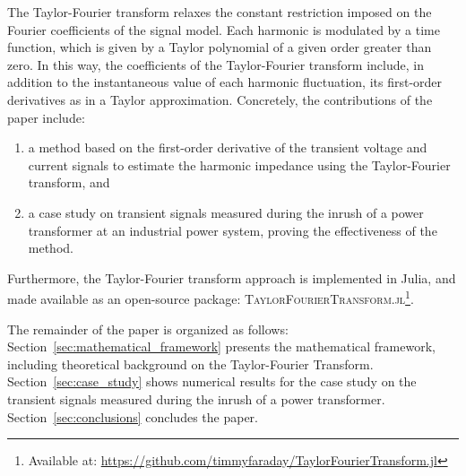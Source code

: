 The Taylor-Fourier transform relaxes the constant restriction imposed on the Fourier coefficients of the signal model. Each harmonic is modulated by a time function, which is given by a Taylor polynomial of a given order greater than zero. In this way, the coefficients of the Taylor-Fourier transform include, in addition to the instantaneous value of each harmonic fluctuation, its first-order derivatives as in a Taylor approximation. Concretely, the contributions of the paper include:
\begin{enumerate}
    \item a method based on the first-order derivative of the transient voltage and current signals to estimate the harmonic impedance using the Taylor-Fourier transform, and
    \item a case study on transient signals measured during the inrush of a power transformer at an industrial power system, proving the effectiveness of the method.
\end{enumerate}
Furthermore, the Taylor-Fourier transform approach is implemented in Julia, and made available as an open-source package: \textsc{TaylorFourierTransform.jl}\footnote{Available at: \href{https://github.com/timmyfaraday/TaylorFourierTransform.jl}{https://github.com/timmyfaraday/TaylorFourierTransform.jl}}.

The remainder of the paper is organized as follows: Section~\ref{sec:mathematical_framework} presents the mathematical framework, including theoretical background on the Taylor-Fourier Transform. Section~\ref{sec:case_study} shows numerical results for the case study on the transient signals measured during the inrush of a power transformer. Section~\ref{sec:conclusions} concludes the paper.